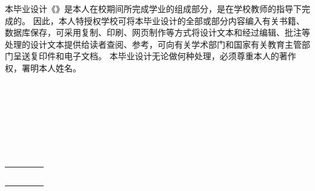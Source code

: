 
\begin{authorizationzh}
	
本毕业设计《\qquad \qquad \qquad \qquad \qquad \qquad \qquad \qquad \qquad \qquad \qquad》是本人在校期间所完成学业的组成部分，是在学校教师的指导下完成的。
因此，本人特授权学校可将本毕业设计的全部或部分内容编入有关书籍、数据库保存，可采用复制、印刷、网页制作等方式将设计文本和经过编辑、批注等处理的设计文本提供给读者查阅、参考，可向有关学术部门和国家有关教育主管部门呈送复印件和电子文档。
本毕业设计无论做何种处理，必须尊重本人的著作权，署明本人姓名。
\\
\\
\\
\\
\\
\\
\\
\\

	
	\vspace{30pt}
	\begin{tabular}{llll}
		\makebox[4em][s]{设计作者（签字）} & \makebox[150pt][c]{  } & \makebox[2em][s]{时间} & \makebox[100pt][c]{\qquad 年\quad 月\quad   日 }\\
		\\ \\ \\
		\makebox[4em][s]{指导教师已阅（签字）} & \makebox[150pt][c]{  } & \makebox[2em][s]{时间} & \makebox[100pt][c]{\qquad 年\quad 月\quad   日 }\\
	\end{tabular}

	
	
\end{authorizationzh}
